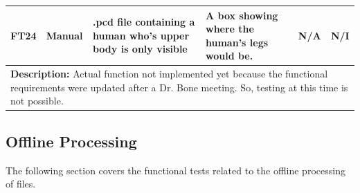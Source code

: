 \documentclass[12pt, titlepage]{article}
\begin{document}
\begin{table}[H]
{\begin{tabular}{|p{1.5cm}|p{2.5cm}|p{3cm}|p{4cm}|p{4cm}|p{1.8cm}|}
      \hline
      FT24 & Manual & \raggedright .pcd file containing a human who’s upper body is only visible \par & \raggedright A box showing where the human's legs would be. \par & N/A & N/I \\
      \hline
      \multicolumn{6}{|p{\textwidth}|}{\raggedright \textbf{Description:} Actual function not implemented yet because the functional requirements were updated after a Dr. Bone meeting. So, testing at this time is not possible. \par} \\
      \hline
  \end{tabular}
  }
\end{table}


\subsection{Offline Processing}
The following section covers the functional tests related to the offline processing of files.
\end{document}
